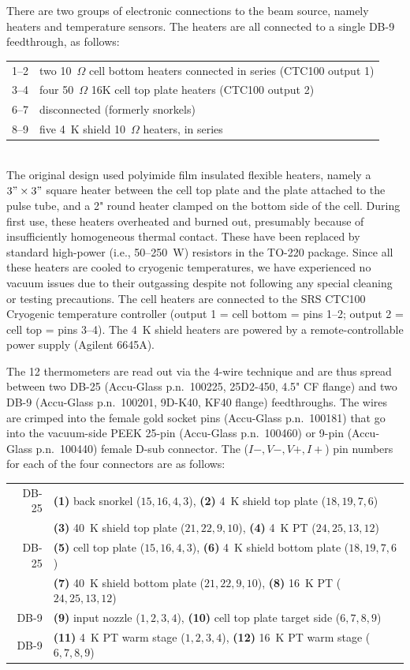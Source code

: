 There are two groups of electronic connections to the beam source, namely
heaters and temperature sensors. The heaters are all connected to a single DB-9
feedthrough, as follows:\\

\begin{tabular}{rl}
1--2 & two 10~$\Omega$ cell bottom heaters connected in series (CTC100 output
    1)\\
3--4 & four 50~$\Omega$ 16K cell top plate heaters (CTC100 output 2)\\
6--7 & disconnected (formerly snorkels)\\
8--9 & five 4~K shield 10~$\Omega$ heaters, in series
\end{tabular}\\

The original design used polyimide film insulated flexible heaters, namely a
$3"\times3"$ square heater between the cell top plate and the plate attached to
the pulse tube, and a 2" round heater clamped on the bottom side of the cell.
During first use, these heaters overheated and burned out, presumably because of
insufficiently homogeneous thermal contact. These have been replaced by
standard high-power (i.e., 50--250~W) resistors in the TO-220 package. Since all
these heaters are cooled to cryogenic temperatures, we have experienced no
vacuum issues due to their outgassing despite not following any special cleaning
or testing precautions. The cell heaters are connected to the SRS CTC100
Cryogenic temperature controller (output 1 = cell bottom = pins 1--2; output 2 =
cell top = pins 3--4). The 4~K shield heaters are powered by a
remote-controllable power supply (Agilent 6645A).

The 12 thermometers are read out via the 4-wire technique and are thus spread
between two DB-25 (Accu-Glass p.n.\ 100225, 25D2-450, 4.5" CF flange) and two
DB-9 (Accu-Glass p.n.\ 100201, 9D-K40, KF40 flange) feedthroughs. The wires are
crimped into the female gold socket pins (Accu-Glass p.n.\ 100181) that go into
the vacuum-side PEEK 25-pin (Accu-Glass p.n.\ 100460) or 9-pin (Accu-Glass p.n.\
100440) female D-sub connector. The ($I-,V-,V+,I+$) pin numbers for each of the
four connectors are as follows:\\

\begin{tabular}{rl}
   DB-25 & \textbf{(1)} back snorkel ($15,16,4,3$), \textbf{(2)} 4~K shield top plate ($18,19,7,6$) \\
         & \textbf{(3)} 40~K shield top plate ($21,22,9,10$), \textbf{(4)} 4~K PT ($24,25,13,12$) \\
   DB-25 & \textbf{(5)} cell top plate ($15,16,4,3$), \textbf{(6)} 4~K shield bottom plate ($18,19,7,6$) \\
         & \textbf{(7)} 40~K shield bottom plate ($21,22,9,10$), \textbf{(8)} 16~K PT ($24,25,13,12$) \\
   DB-9  & \textbf{(9)} input nozzle ($1,2,3,4$), \textbf{(10)} cell top plate target side ($6,7,8,9$) \\
   DB-9  & \textbf{(11)} 4~K PT warm stage ($1,2,3,4$), \textbf{(12)} 16~K PT warm stage ($6,7,8,9$)
\end{tabular}\\

